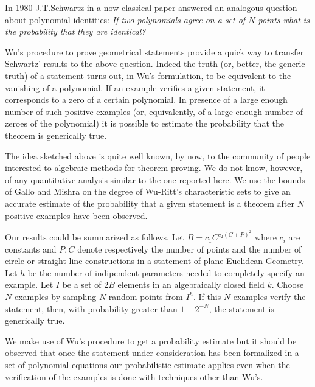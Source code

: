 \medskip
\noindent
In 1980 J.T.Schwartz in a now classical paper answered an analogous question 
about polynomial identities: {\em If two polynomials agree on a set of $N$ 
points what is the probability that they are identical?} 

\medskip
\noindent
Wu's procedure to prove geometrical statements provide a quick way to transfer 
Schwartz' results to the above question. Indeed the truth 
(or, better, the generic truth) of a statement turns out, in Wu's formulation, 
to be equivalent to the vanishing of a polynomial.
If an example verifies a given statement, it corresponds to a  
zero of a certain polynomial. In presence of a large enough number of such 
positive examples (or, equivalently, of a large enough number of zeroes of 
the polynomial) it is possible to estimate the probability that the theorem 
is generically true.

\medskip
\noindent
The idea sketched above is quite well known, by now, to the community of 
people interested to algebraic methods for theorem proving. We do 
not know, however, of any quantitative analysis similar to the one 
reported here. We use the bounds of Gallo and Mishra on the degree of
Wu-Ritt's characteristic sets to give an accurate estimate of the probability 
that a given statement is a theorem after $N$ positive examples have been 
observed.

\medskip
\noindent
Our results could be summarized as follows. Let $B=c_1 C^{c_2(C+P)^2}$ 
where $c_i$ are constants and $P,C$ denote respectively the number of 
points and the number of circle or straight line constructions in a 
statement of plane Euclidean Geometry. Let $h$ be the number of indipendent 
parameters needed to completely specify an example.
Let $I$ be a set of $2B$ elements in an algebraically closed field $k$. 
Choose $N$ examples by sampling $N$ random points from $I^h$. 
If this $N$ examples verify the statement, then, with probability 
greater than $1 - 2^{-N}$, the statement is generically true.  

\medskip
\noindent
We make use of Wu's procedure to get a probability estimate but it should be 
observed that once the statement under consideration has been formalized in a 
set of polynomial equations our probabilistic estimate applies even when the 
verification of the examples is done with techniques other than Wu's.           



